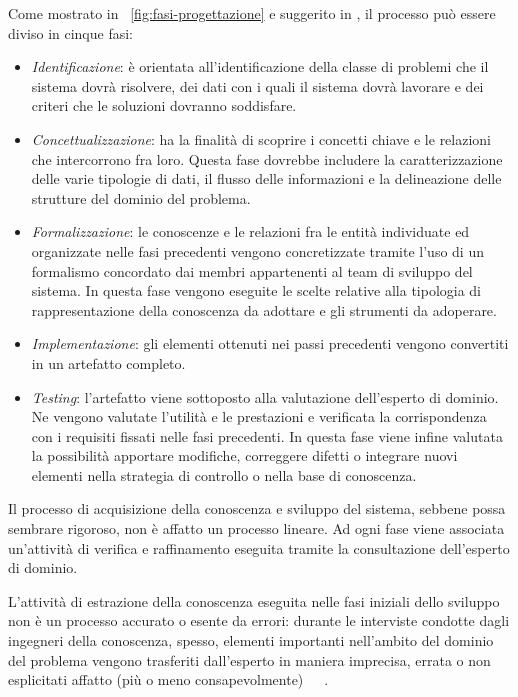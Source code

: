 Come mostrato in \figurename~\ref{fig:fasi-progettazione} e suggerito in \cite{buchanan1983}, il processo può essere diviso in cinque fasi:
\begin{itemize}
	\item \emph{Identificazione}: è orientata all'identificazione della classe di problemi che il sistema dovrà risolvere, dei dati con i quali il sistema dovrà lavorare e dei criteri che le soluzioni dovranno soddisfare.
	
	\item \emph{Concettualizzazione}: ha la finalità di scoprire i concetti chiave e le relazioni che intercorrono fra loro. Questa fase dovrebbe includere la caratterizzazione delle varie tipologie di dati, il flusso delle informazioni e la delineazione delle strutture del dominio del problema.
	
	\item \emph{Formalizzazione}: le conoscenze e le relazioni fra le entità individuate ed organizzate nelle fasi precedenti vengono concretizzate tramite l'uso di un formalismo concordato dai membri appartenenti al team di sviluppo del sistema. In questa fase vengono eseguite le scelte relative alla tipologia di rappresentazione della conoscenza da adottare e gli strumenti da adoperare.
	\item \emph{Implementazione}: gli elementi ottenuti nei passi precedenti vengono convertiti in un artefatto completo.
	\item \emph{Testing}: l'artefatto viene sottoposto alla valutazione dell'esperto di dominio. Ne vengono valutate l'utilità e le prestazioni e verificata la corrispondenza con i requisiti fissati nelle fasi precedenti. In questa fase viene infine valutata la possibilità apportare modifiche, correggere difetti o integrare nuovi elementi nella strategia di controllo o nella base di conoscenza.
\end{itemize}

Il processo di acquisizione della conoscenza e sviluppo del sistema, sebbene possa sembrare rigoroso, non è affatto un processo lineare. Ad ogni fase viene associata un'attività di verifica e raffinamento eseguita tramite la consultazione dell'esperto di dominio.

L'attività di estrazione della conoscenza eseguita nelle fasi iniziali dello sviluppo non è un processo accurato o esente da errori: durante le interviste condotte dagli ingegneri della conoscenza, spesso, elementi importanti nell'ambito del dominio del problema vengono trasferiti dall'esperto in maniera imprecisa, errata o non esplicitati affatto (più o meno consapevolmente)~\cite{jackson1999}~\cite{schank1984ia}~\cite{buchanan1983}.

